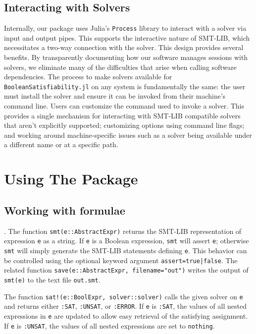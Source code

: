 \documentclass[conference]{IEEEtran}
\begin{document}
\subsection{Interacting with Solvers}
Internally, our package uses Julia's \verb|Process| library to interact with a solver via input and output pipes. This supports the interactive nature of SMT-LIB, which necessitates a two-way connection with the solver.
This design provides several benefits. By transparently documenting how our software manages sessions with solvers, we eliminate many of the difficulties that arise when calling software dependencies. The process to make solvers available for \verb|BooleanSatisfiability.jl| on any system is fundamentally the same: the user must install the solver and ensure it can be invoked from their machine's command line. Users can customize the command used to invoke a solver. This provides a single mechanism for interacting with SMT-LIB compatible solvers that aren't explicitly supported; customizing options using command line flags; and working around machine-specific issues such as a solver being available under a different name or at a specific path.

\section{Using The Package}
\subsection{Working with formulae}.
The function \verb|smt(e::AbstractExpr)| returns the SMT-LIB representation of expression \verb|e| as a string. If \verb|e| is a Boolean expression, \verb|smt| will assert \verb|e|; otherwise \verb|smt| will simply generate the SMT-LIB statements defining \verb|e|. This behavior can be controlled using the optional keyword argument \texttt{assert=true|false}. The related function \verb|save(e::AbstractExpr, filename="out")| writes the output of \verb|smt(e)| to the text file \verb|out.smt|.

The function \verb|sat!(e::BoolExpr, solver::solver)| calls the given solver on \verb|e| and returns either \verb|:SAT|, \verb|:UNSAT|, or \verb|:ERROR|. If \verb|e| is \verb|:SAT|, the values of all nested expressions in \verb|e| are updated to allow easy retrieval of the satisfying assignment. If \verb|e| is \verb|:UNSAT|, the values of all nested expressions are set to \verb|nothing|.
\end{document}
